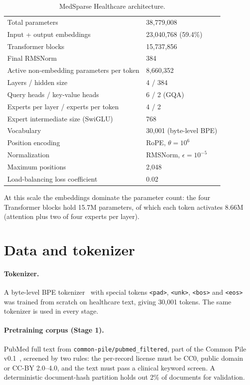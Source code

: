 \documentclass[11pt,a4paper]{article}
\begin{document}
\begin{table}[t]
\centering
\caption{MedSparse Healthcare architecture.}
\label{tab:arch}
\begin{tabular}{@{}ll@{}}
\toprule
Total parameters & 38,779,008 \\
\quad Input + output embeddings & 23,040,768 (59.4\%) \\
\quad Transformer blocks & 15,737,856 \\
\quad Final RMSNorm & 384 \\
Active non-embedding parameters per token & 8,660,352 \\
Layers / hidden size & 4 / 384 \\
Query heads / key-value heads & 6 / 2 (GQA) \\
Experts per layer / experts per token & 4 / 2 \\
Expert intermediate size (SwiGLU) & 768 \\
Vocabulary & 30,001 (byte-level BPE) \\
Position encoding & RoPE, $\theta = 10^6$ \\
Normalization & RMSNorm, $\epsilon = 10^{-5}$ \\
Maximum positions & 2,048 \\
Load-balancing loss coefficient & 0.02 \\
\bottomrule
\end{tabular}
\end{table}

At this scale the embeddings dominate the parameter count: the four Transformer blocks hold 15.7M parameters, of which each token activates 8.66M (attention plus two of four experts per layer).

\section{Data and tokenizer}

\paragraph{Tokenizer.} A byte-level BPE tokenizer~\citep{sennrich2016bpe,radford2019gpt2} with special tokens \texttt{<pad>}, \texttt{<unk>}, \texttt{<bos>} and \texttt{<eos>} was trained from scratch on healthcare text, giving 30,001 tokens. The same tokenizer is used in every stage.

\paragraph{Pretraining corpus (Stage 1).} PubMed full text from \texttt{common-pile/pubmed\_filtered}, part of the Common Pile v0.1~\citep{kandpal2025commonpile}, screened by two rules: the per-record license must be CC0, public domain or CC-BY 2.0--4.0, and the text must pass a clinical keyword screen. A deterministic document-hash partition holds out 2\% of documents for validation.
\end{document}
